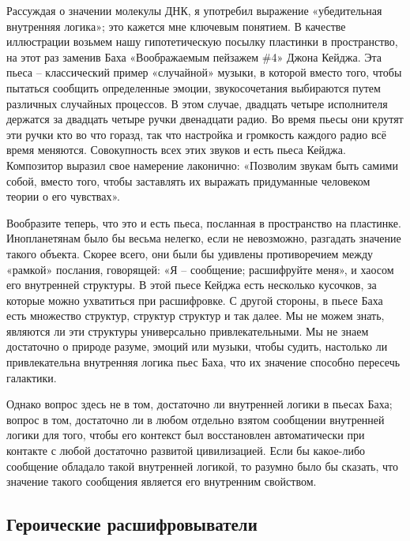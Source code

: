 \documentclass[../main.tex]{subfiles}
\begin{document}
Рассуждая о значении молекулы ДНК, я употребил выражение «убедительная внутренняя логика»; это кажется мне ключевым понятием. В качестве иллюстрации возьмем нашу гипотетическую посылку пластинки в пространство, на этот раз заменив Баха «Воображаемым пейзажем \#4» Джона Кейджа. Эта пьеса \--- классический пример «случайной» музыки, в которой вместо того, чтобы пытаться сообщить определенные эмоции, звукосочетания выбираются путем различных случайных процессов. В этом случае, двадцать четыре исполнителя держатся за двадцать четыре ручки двенадцати радио. Во время пьесы они крутят эти ручки кто во что горазд, так что настройка и громкость каждого радио всё время меняются. Совокупность всех этих звуков и есть пьеса Кейджа. Композитор выразил свое намерение лаконично: «Позволим звукам быть самими собой, вместо того, чтобы заставлять их выражать придуманные человеком теории о его чувствах».

Вообразите теперь, что это и есть пьеса, посланная в пространство на пластинке. Инопланетянам было бы весьма нелегко, если не невозможно, разгадать значение такого объекта. Скорее всего, они были бы удивлены противоречием между «рамкой» послания, говорящей: «Я \--- сообщение; расшифруйте меня», и хаосом его внутренней структуры. В этой пьесе Кейджа есть несколько кусочков, за которые можно ухватиться при расшифровке. С другой стороны, в пьесе Баха есть множество структур, структур структур и так далее. Мы не можем знать, являются ли эти структуры универсально привлекательными. Мы не знаем достаточно о природе разуме, эмоций или музыки, чтобы судить, настолько ли привлекательна внутренняя логика пьес Баха, что их значение способно пересечь галактики.

Однако вопрос здесь не в том, достаточно ли внутренней логики в пьесах Баха; вопрос в том, достаточно ли в любом отдельно взятом сообщении внутренней логики для того, чтобы его контекст был восстановлен автоматически при контакте с любой достаточно развитой цивилизацией. Если бы какое-либо сообщение обладало такой внутренней логикой, то разумно было бы сказать, что значение такого сообщения является его внутренним свойством.


\subsection{Героические расшифровыватели}
\end{document}
